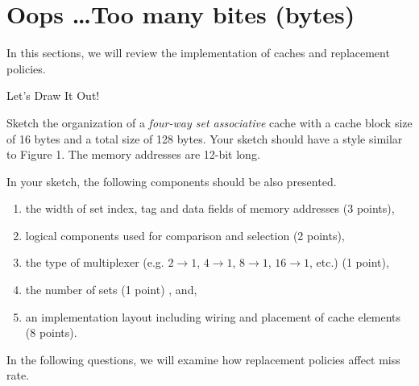 \section{Oops \dots Too many bites (bytes)}
In this sections, we will review the implementation of caches and
replacement policies.

\begin{questions}

\question[15] Let's Draw It Out!

Sketch the organization of a \emph{four-way set associative} cache
with a cache block size of 16 bytes and a total size of 128 bytes.
Your sketch should have a style similar to Figure 1. The memory
addresses are 12-bit long.

In your sketch, the following components should be also presented.

\begin{enumerate}
    \item the width of set index, tag and data fields of memory
    addresses (3 points),
    \item logical components used for comparison and selection
    (2 points),
    \item the type of multiplexer (e.g. $2\rightarrow1$,
    $4\rightarrow1$, $8\rightarrow1$, $16\rightarrow1$, etc.)
    (1 point),
    \item the number of sets (1 point) , and,
    \item an implementation layout including wiring and placement
    of cache elements (8 points).
\end{enumerate}



{
    \begin{solution}
    \vspace{5in}
    \end{solution}
}
\newpage

In the following questions, we will examine how replacement policies
affect miss rate.


\end{questions}

